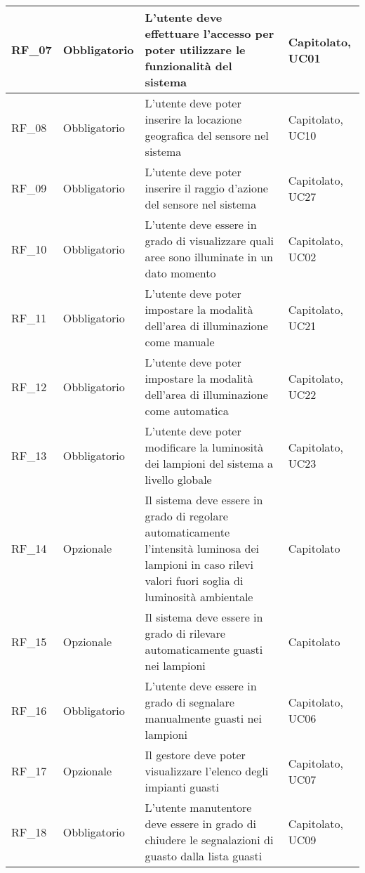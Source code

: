 \begin{center}
\begin{xltabular}{\linewidth}{|l|l|X|l|}
        \hline
        RF\_07 & Obbligatorio & L'utente deve effettuare l'accesso per poter utilizzare le funzionalità del sistema & Capitolato, UC01\\

        \hline
        RF\_08 & Obbligatorio & L'utente deve poter inserire la locazione geografica del sensore nel sistema & Capitolato, UC10\\

        \hline
        RF\_09 & Obbligatorio & L'utente deve poter inserire il raggio d'azione del sensore nel sistema & Capitolato, UC27\\

        \hline
        RF\_10 & Obbligatorio & L'utente deve essere in grado di visualizzare quali aree sono illuminate in un dato momento & Capitolato, UC02\\

        \hline
        RF\_11 & Obbligatorio & L'utente deve poter impostare la modalità dell'area di illuminazione come manuale & Capitolato, UC21\\

        \hline
        RF\_12 & Obbligatorio & L'utente deve poter impostare la modalità dell'area di illuminazione come automatica & Capitolato, UC22\\

        \hline
        RF\_13 & Obbligatorio & L'utente deve poter modificare la luminosità dei lampioni del sistema a livello globale & Capitolato, UC23\\

        \hline
        RF\_14 & Opzionale & Il sistema deve essere in grado di regolare automaticamente l'intensità luminosa dei lampioni in caso rilevi valori fuori soglia di luminosità ambientale & Capitolato\\

        \hline
        RF\_15 & Opzionale & Il sistema deve essere in grado di rilevare automaticamente guasti nei lampioni & Capitolato \\

        \hline
        RF\_16 & Obbligatorio & L'utente deve essere in grado di segnalare manualmente guasti nei lampioni & Capitolato, UC06 \\

        \hline
        RF\_17 & Opzionale & Il gestore deve poter visualizzare l'elenco degli impianti guasti & Capitolato, UC07 \\

        \hline
        RF\_18 & Obbligatorio & L'utente manutentore deve essere in grado di chiudere le segnalazioni di guasto dalla lista guasti & Capitolato, UC09 \\


\end{xltabular}
\end{center}
